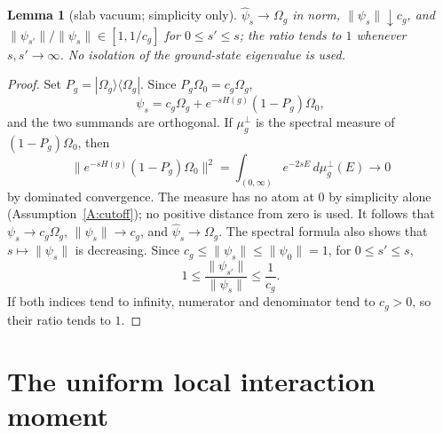 \documentclass[11pt,a4paper]{article}
\theoremstyle{plain}
\newtheorem{lemma}[theorem]{Lemma}
\theoremstyle{definition}
\theoremstyle{plain}
\theoremstyle{definition}
\newcommand{\Om}{\Omega}
\begin{document}
\begin{lemma}[slab vacuum; simplicity only]\label{lem:slabvac}
$\hat\psi_s\to\Om_g$ in norm, $\|\psi_s\|\downarrow c_g$, and
$\|\psi_{s'}\|/\|\psi_s\|\in[1,1/c_g]$ for $0\le s'\le s$; the ratio tends to $1$ whenever
$s,s'\to\infty$. \emph{No isolation of the ground-state eigenvalue is used.}
\end{lemma}

\begin{proof}
Set $P_g=|\Om_g\rangle\langle\Om_g|$. Since $P_g\Om_0=c_g\Om_g$,
\[
 \psi_s=c_g\Om_g+e^{-sH(g)}(1-P_g)\Om_0,
\]
and the two summands are orthogonal. If $\mu_g^\perp$ is the spectral measure of
$(1-P_g)\Om_0$, then
\[
 \|e^{-sH(g)}(1-P_g)\Om_0\|^2
 =\int_{(0,\infty)}e^{-2sE}\,d\mu_g^\perp(E)\longrightarrow0
\]
by dominated convergence. The measure has no atom at $0$ by simplicity alone
(Assumption~\ref{A:cutoff}); no positive distance from zero is used. It follows that
$\psi_s\to c_g\Om_g$, $\|\psi_s\|\to c_g$, and $\hat\psi_s\to\Om_g$. The spectral formula
also shows that $s\mapsto\|\psi_s\|$ is decreasing. Since
$c_g\le\|\psi_s\|\le\|\psi_0\|=1$, for $0\le s'\le s$,
\[
 1\le\frac{\|\psi_{s'}\|}{\|\psi_s\|}\le\frac1{c_g}.
\]
If both indices tend to infinity, numerator and denominator tend to $c_g>0$, so their ratio
tends to $1$.
\end{proof}

\section{The uniform local interaction moment}\label{sec:M2}
\end{document}
